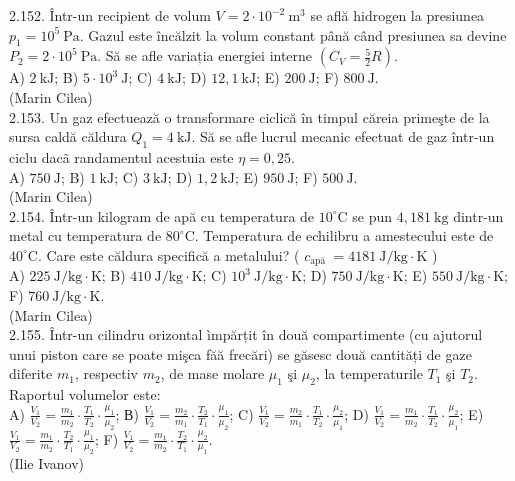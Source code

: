 2.152. Într-un recipient de volum $V=2 \cdot 10^{-2} \mathrm{~m}^{3}$ se află hidrogen la presiunea $p_{1}=10^{5} \mathrm{~Pa}$. Gazul este încălzit la volum constant până când presiunea sa devine $P_{2}=2 \cdot 10^{5} \mathrm{~Pa}$. Să se afle variația energiei interne $\left(C_{V}=\frac{5}{2} R\right)$.\\ A) $2 \mathrm{~kJ}$; B) $5 \cdot 10^{3} \mathrm{~J}$; C) $4 \mathrm{~kJ}$; D) $12,1 \mathrm{~kJ}$; E) $200 \mathrm{~J}$; F) $800 \mathrm{~J}$.\\ (Marin Cilea)\\

2.153. Un gaz efectuează o transformare ciclică în timpul căreia primeşte de la sursa caldă căldura $Q_{1}=4 \mathrm{~kJ}$. Să se afle lucrul mecanic efectuat de gaz într-un ciclu dacã randamentul acestuia este $\eta=0,25$.\\ A) $750 \mathrm{~J}$; B) $1 \mathrm{~kJ}$; C) $3 \mathrm{~kJ}$; D) $1,2 \mathrm{~kJ}$; E) $950 \mathrm{~J}$; F) $500 \mathrm{~J}$.\\ (Marin Cilea)\\

2.154. Într-un kilogram de apă cu temperatura de $10^{\circ} \mathrm{C}$ se pun $4,181 \mathrm{~kg}$ dintr-un metal cu temperatura de $80^{\circ} \mathrm{C}$. Temperatura de echilibru a amestecului este de $40^{\circ} \mathrm{C}$. Care este căldura specifică a metalului? ( $c_{\text {apă }}=4181 \mathrm{~J} / \mathrm{kg} \cdot \mathrm{K}$ )\\ A) $225 \mathrm{~J} / \mathrm{kg} \cdot \mathrm{K}$; B) $410 \mathrm{~J} / \mathrm{kg} \cdot \mathrm{K}$; C) $10^{3} \mathrm{~J} / \mathrm{kg} \cdot \mathrm{K}$; D) $750 \mathrm{~J} / \mathrm{kg} \cdot \mathrm{K}$; E) $550 \mathrm{~J} / \mathrm{kg} \cdot \mathrm{K}$; F) $760 \mathrm{~J} / \mathrm{kg} \cdot \mathrm{K}$.\\ (Marin Cilea)\\

2.155. Într-un cilindru orizontal ìmpărțit în două compartimente (cu ajutorul unui piston care se poate mişca făă frecări) se găsesc două cantități de gaze diferite $m_{1}$, respectiv $m_{2}$, de mase molare $\mu_{1}$ şi $\mu_{2}$, la temperaturile $T_{1}$ şi $T_{2}$. Raportul volumelor este:\\ A) $\frac{V_{1}}{V_{2}}=\frac{m_{1}}{m_{2}} \cdot \frac{T_{1}}{T_{2}} \cdot \frac{\mu_{1}}{\mu_{2}}$; В) $\frac{V_{1}}{V_{2}}=\frac{m_{2}}{m_{1}} \cdot \frac{T_{2}}{T_{1}} \cdot \frac{\mu_{1}}{\mu_{2}}$; C) $\frac{V_{1}}{V_{2}}=\frac{m_{2}}{m_{1}} \cdot \frac{T_{1}}{T_{2}} \cdot \frac{\mu_{2}}{\mu_{1}}$; D) $\frac{V_{1}}{V_{2}}=\frac{m_{1}}{m_{2}} \cdot \frac{T_{1}}{T_{2}} \cdot \frac{\mu_{2}}{\mu_{1}}$; E) $\frac{V_{1}}{V_{2}}=\frac{m_{1}}{m_{2}} \cdot \frac{T_{2}}{T_{1}} \cdot \frac{\mu_{1}}{\mu_{2}}$; F) $\frac{V_{1}}{V_{2}}=\frac{m_{1}}{m_{2}} \cdot \frac{T_{2}}{T_{1}} \cdot \frac{\mu_{2}}{\mu_{1}}$.\\ (Ilie Ivanov)\\

